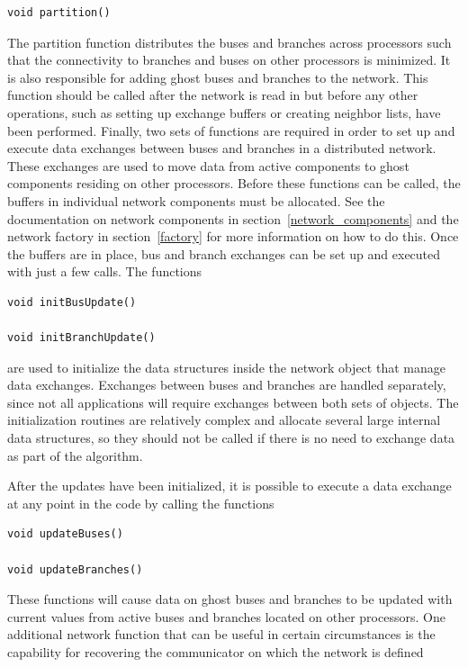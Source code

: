 {
\color{red}
\begin{Verbatim}[fontseries=b]
void partition()
\end{Verbatim}
}

The partition function distributes the buses and branches across processors such that the connectivity to branches and buses on other processors is minimized. It is also responsible for adding ghost buses and branches to the network. This function should be called after the network is read in but before any other operations, such as setting up exchange buffers or creating neighbor lists, have been performed.
Finally, two sets of functions are required in order to set up and execute data
exchanges between buses and branches in a distributed network. These exchanges
are used to move data from active components to ghost components residing on
other processors. Before these functions can be called, the buffers in
individual network components must be allocated. See the documentation on
network components in section~\ref{network_components} and the network factory
in section~\ref{factory} for more information on how to do this. Once the buffers are in place, bus and branch exchanges can be set up and executed with just a few calls. The functions

{
\color{red}
\begin{Verbatim}[fontseries=b]
void initBusUpdate()

void initBranchUpdate()
\end{Verbatim}
}

are used to initialize the data structures inside the network object that manage data exchanges. Exchanges between buses and branches are handled separately, since not all applications will require exchanges between both sets of objects. The initialization routines are relatively complex and allocate several large internal data structures, so they should not be called if there is no need to exchange data as part of the algorithm.

After the updates have been initialized, it is possible to execute a data exchange at any point in the code by calling the functions

{
\color{red}
\begin{Verbatim}[fontseries=b]
void updateBuses()

void updateBranches()
\end{Verbatim}
}

These functions will cause data on ghost buses and branches to be updated with current values from active buses and branches located on other processors.
One additional network function that can be useful in certain circumstances is the capability for recovering the communicator on which the network is defined

